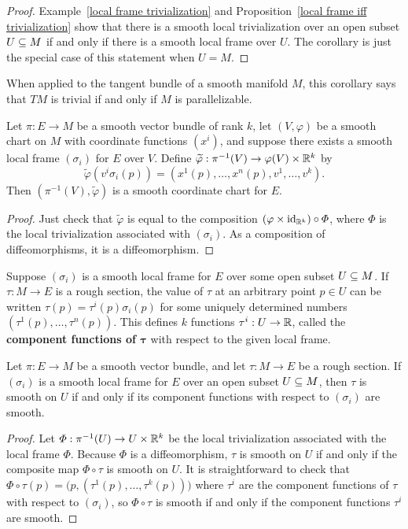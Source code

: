 \begin{proof}
Example~\ref{local frame trivialization} and Proposition~\ref{local frame iff trivialization} show that there is a smooth local trivialization over an open subset $U\subseteq M$ if and only if there is a smooth local frame over $U$. The corollary is just the special case of this statement when $U=M$.
\end{proof}
When applied to the tangent bundle of a smooth manifold $M$, this corollary says that $TM$ is trivial if and only if $M$ is parallelizable.
\begin{corollary}\label{vector bundle chart from frame}
Let $\pi:E\to M$ be a smooth vector bundle of rank $k$, let $(V,\varphi)$ be a smooth chart on $M$ with coordinate functions $(x^i)$, and suppose there exists a smooth local frame $(\sigma_i)$ for $E$ over $V$. Define $\widetilde{\varphi}:\pi^{-1}(V)\to\varphi(V)\times\mathbb{R}^k$ by
\[\widetilde{\varphi}(v^i\sigma_i(p))=(x^1(p),\dots,x^n(p),v^1,\dots,v^k).\]
Then $(\pi^{-1}(V),\widetilde{\varphi})$ is a smooth coordinate chart for $E$.
\end{corollary}
\begin{proof}
Just check that $\widetilde{\varphi}$ is equal to the composition $(\varphi\times\mathrm{id}_{\mathbb{R}^k})\circ\varPhi$, where $\varPhi$ is the local trivialization associated with $(\sigma_i)$. As a composition of diffeomorphisms, it is a diffeomorphism.
\end{proof}
Suppose $(\sigma_i)$ is a smooth local frame for $E$ over some open subset $U\subseteq M$. If $\tau:M\to E$ is a rough section, the value of $\tau$ at an arbitrary point $p\in U$ can be written $\tau(p)=\tau^i(p)\sigma_i(p)$ for some uniquely determined numbers $(\tau^1(p),\dots,\tau^n(p))$. This defines $k$ functions $\tau^i:U\to\mathbb{R}$, called the \textbf{component functions of $\bm{\tau}$} with respect to the given local frame.
\begin{proposition}\label{local frame smooth crit}
Let $\pi:E\to M$ be a smooth vector bundle, and let $\tau:M\to E$ be a rough section. If $(\sigma_i)$ is a smooth local frame for $E$ over an open subset $U\subseteq M$, then $\tau$ is smooth on $U$ if and only if its component functions with respect to $(\sigma_i)$ are smooth.
\end{proposition}
\begin{proof}
Let $\varPhi:\pi^{-1}(U)\to U\times\mathbb{R}^k$ be the local trivialization associated with the local frame $\varPhi$. Because $\varPhi$ is a diffeomorphism, $\tau$ is smooth on $U$ if and only if the composite map $\varPhi\circ\tau$ is smooth on $U$. It is straightforward to check that $\varPhi\circ\tau(p)=\big(p,(\tau^1(p),\dots,\tau^k(p))\big)$ where $\tau^i$ are the component functions of $\tau$ with respect to $(\sigma_i)$, so $\varPhi\circ\tau$ is smooth if and only if the component functions $\tau^i$
are smooth.
\end{proof}

